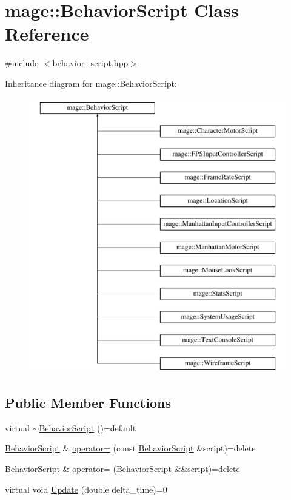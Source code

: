 \hypertarget{classmage_1_1_behavior_script}{}\section{mage\+:\+:Behavior\+Script Class Reference}
\label{classmage_1_1_behavior_script}


{\ttfamily \#include $<$behavior\+\_\+script.\+hpp$>$}

Inheritance diagram for mage\+:\+:Behavior\+Script\+:\begin{figure}[H]
\begin{center}
\leavevmode
\includegraphics[height=12.000000cm]{classmage_1_1_behavior_script}
\end{center}
\end{figure}
\subsection*{Public Member Functions}
\begin{DoxyCompactItemize}
\item 
virtual \hyperlink{classmage_1_1_behavior_script_ac0aec6b7d3c0f3d009a1b4bd84295775}{$\sim$\+Behavior\+Script} ()=default
\item 
\hyperlink{classmage_1_1_behavior_script}{Behavior\+Script} \& \hyperlink{classmage_1_1_behavior_script_a0b3327ebf7009e668a7022d254cb1d51}{operator=} (const \hyperlink{classmage_1_1_behavior_script}{Behavior\+Script} \&script)=delete
\item 
\hyperlink{classmage_1_1_behavior_script}{Behavior\+Script} \& \hyperlink{classmage_1_1_behavior_script_a528c2bd218f2e6bb7d0a8ee50a05bf01}{operator=} (\hyperlink{classmage_1_1_behavior_script}{Behavior\+Script} \&\&script)=delete
\item 
virtual void \hyperlink{classmage_1_1_behavior_script_a905b6c83640cb91d19fecab3435f6feb}{Update} (double delta\+\_\+time)=0
\end{DoxyCompactItemize}
